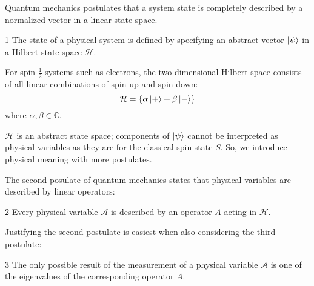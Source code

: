 Quantum mechanics postulates that a system state is completely described by a normalized vector in a linear state space.

\begin{Thm:Postulate}{1}
    The state of a physical system is defined by specifying an abstract vector $\ket{\psi}$ in a Hilbert state space $\mathcal{H}$.
\end{Thm:Postulate}

For spin-$\frac{1}{2}$ systems such as electrons, the two-dimensional Hilbert space consists of all linear combinations of spin-up and spin-down:
\begin{equation}
    \mathcal{H} = \{\alpha\ket{+} + \beta\ket{-}\}
\end{equation}
where $\alpha, \beta \in \mathbb{C}$.

$\mathcal{H}$ is an abstract state space; components of $\ket{\psi}$ cannot be interpreted as physical variables as they are for the classical spin state $S$. So, we introduce physical meaning with more postulates.

The second posulate of quantum mechanics states that physical variables are described by linear operators:
\begin{Thm:Postulate}{2}
    Every physical variable $\mathcal{A}$ is described by an operator $A$ acting in $\mathcal{H}$.
\end{Thm:Postulate}

Justifying the second postulate is easiest when also considering the third postulate:
\begin{Thm:Postulate}{3}
    The only possible result of the measurement of a physical variable $\mathcal{A}$ is one of the eigenvalues of the corresponding operator $A$.
\end{Thm:Postulate}

